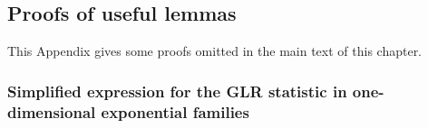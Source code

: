 \subsection{Proofs of useful lemmas}\label{proof:6:Conc}

This Appendix gives some proofs omitted in the main text of this chapter.

\subsubsection{Simplified expression for the GLR statistic in one-dimensional exponential families}\label{app:6:GLR_with_kl}







